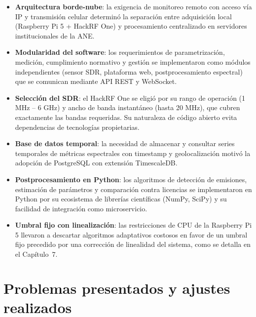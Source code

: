 \begin{itemize}[leftmargin=*]
    \item \textbf{Arquitectura borde-nube}: la exigencia de monitoreo remoto con acceso vía IP y transmisión celular determinó la separación entre adquisición local (Raspberry Pi 5 + HackRF One) y procesamiento centralizado en servidores institucionales de la ANE.
    \item \textbf{Modularidad del software}: los requerimientos de parametrización, medición, cumplimiento normativo y gestión se implementaron como módulos independientes (sensor SDR, plataforma web, postprocesamiento espectral) que se comunican mediante API REST y WebSocket.
    \item \textbf{Selección del SDR}: el HackRF One se eligió por su rango de operación (1 MHz -- 6 GHz) y ancho de banda instantáneo (hasta 20 MHz), que cubren exactamente las bandas requeridas. Su naturaleza de código abierto evita dependencias de tecnologías propietarias.
    \item \textbf{Base de datos temporal}: la necesidad de almacenar y consultar series temporales de métricas espectrales con timestamp y geolocalización motivó la adopción de PostgreSQL con extensión TimescaleDB.
    \item \textbf{Postprocesamiento en Python}: los algoritmos de detección de emisiones, estimación de parámetros y comparación contra licencias se implementaron en Python por su ecosistema de librerías científicas (NumPy, SciPy) y su facilidad de integración como microservicio.
    \item \textbf{Umbral fijo con linealización}: las restricciones de CPU de la Raspberry Pi 5 llevaron a descartar algoritmos adaptativos costosos en favor de un umbral fijo precedido por una corrección de linealidad del sistema, como se detalla en el Capítulo~7.
\end{itemize}

\section{Problemas presentados y ajustes realizados}

